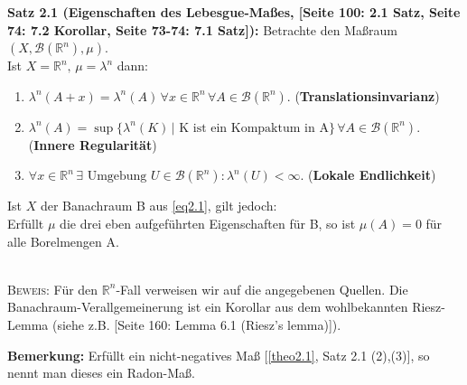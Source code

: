 \colorbox{generalYellow}{\begin{minipage}{16cm}{\textcolor{black}{}{\label{theo2.1}}}
\textbf{Satz 2.1 (Eigenschaften des Lebesgue-Maßes, \cite{ElstrodtMeas}[Seite 100: 2.1 Satz, Seite 74: 7.2 Korollar, Seite 73-74: 7.1 Satz]):} Betrachte den Maßraum \((X,\mathcal{B}(\mathbb{R}^n),\mu)\). \\
Ist \(X=\mathbb{R}^n, \, \mu = \lambda^n\) dann:
\begin{enumerate}
    \item \(\lambda^n(A+x) = \lambda^n(A) \, \forall x \in \mathbb{R}^n \, \forall A \in \mathcal{B}(\mathbb{R}^n)\). (\textbf{Translationsinvarianz})
    \item \(\lambda^n(A) = \sup \{\lambda^n(K) \, | \text{ K ist ein Kompaktum in A}\} \, \forall  A \in \mathcal{B}(\mathbb{R}^n)\). (\textbf{Innere Regularität})
    \item \(\forall x \in \mathbb{R}^n \, \exists \text{ Umgebung } U \in \mathcal{B}(\mathbb{R}^n)\):\(\, \lambda^n(U) < \infty\). (\textbf{Lokale Endlichkeit})
\end{enumerate}
Ist \(X\) der Banachraum B aus \eqref{eq2.1}, gilt jedoch:\\
Erfüllt \(\mu\) die drei eben aufgeführten Eigenschaften für B, so ist \(\mu(A)=0\) für alle Borelmengen A.
\end{minipage}}\\

\textsc{Beweis:} Für den \(\mathbb{R}^n\)-Fall verweisen wir auf die angegebenen Quellen. Die Banachraum-Verallgemeinerung ist ein Korollar aus dem wohlbekannten Riesz-Lemma (siehe z.B. \cite{brezis2011functional}[Seite 160: Lemma 6.1 (Riesz's lemma)]).\QEDB

\textbf{Bemerkung:} Erfüllt ein nicht-negatives Maß [\ref{theo2.1}, Satz 2.1 (2),(3)], so nennt man dieses ein Radon-Maß.\\

